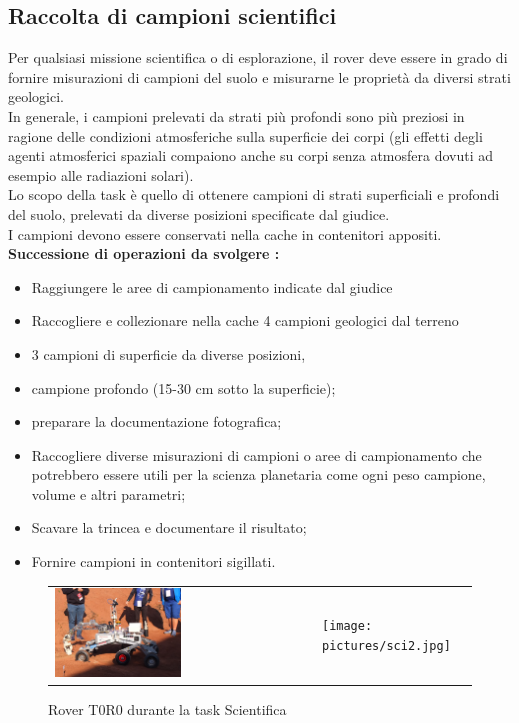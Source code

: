 \documentclass[%
corpo=11pt,
twoside,
 stile=classica,
oldstyle,
greek,%
]{toptesi}
\begin{document}
		\subsection{Raccolta di campioni scientifici}
		
		Per qualsiasi missione scientifica o di esplorazione, il rover deve essere in grado di fornire misurazioni di campioni  del suolo e misurarne le proprietà da diversi strati geologici. \\
		In generale, i campioni prelevati da strati più profondi sono più preziosi in ragione delle condizioni atmosferiche sulla superficie dei corpi (gli effetti degli agenti atmosferici spaziali compaiono anche su corpi senza atmosfera dovuti ad esempio alle radiazioni solari).\\
		
		Lo scopo della task è quello di ottenere campioni di strati superficiali e profondi del suolo, prelevati da diverse posizioni specificate dal giudice. \\
		I campioni devono essere conservati nella cache in contenitori appositi.
		\newline
		\textbf{Successione di operazioni da svolgere :} 
		\begin{itemize}
			\item Raggiungere  le aree di campionamento indicate dal giudice 
			\item Raccogliere e collezionare nella cache 4 campioni geologici dal terreno
			\item 3 campioni di superficie da diverse posizioni,
			\item campione profondo (15-30 cm sotto la superficie);
			\item preparare la documentazione fotografica;
			\item Raccogliere diverse misurazioni di campioni o aree di campionamento che potrebbero essere utili
			per la scienza planetaria come ogni peso campione, volume e altri parametri;
			\item Scavare la trincea e documentare il risultato;
			\item Fornire campioni in contenitori sigillati.
		\end{itemize}
		\begin{figure}
			\centering
			\begin{tabular}{ll}
				\includegraphics[width=0.5\textwidth]{pictures/sci1.jpg}
				&
				\texttt{[image: pictures/sci2.jpg]}
			\end{tabular}
			\caption{Rover T0R0 durante la task Scientifica}
			\label{fig:science}
		\end{figure}
\end{document}
